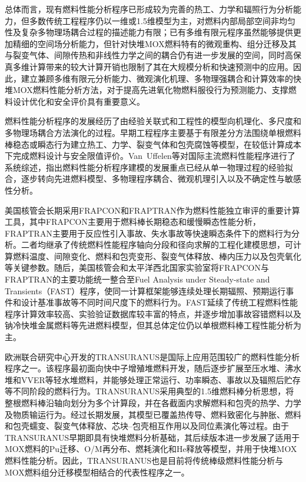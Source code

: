 总体而言，现有燃料性能分析程序已形成较为完善的热工、力学和辐照行为分析能力，但多数传统工程程序仍以一维或1.5维模型为主，对燃料内部局部空间非均匀性及复杂多物理场耦合过程的描述能力有限；已有多维有限元程序虽然能够提供更加精细的空间场分析能力，但针对快堆MOX燃料特有的微观重构、组分迁移及其与裂变气体、间隙传热和非线性力学之间的耦合仍有进一步发展的空间，同时高保真多维计算带来的较大计算开销也限制了其在大规模分析和快速预测中的应用。因此，建立兼顾多维有限元分析能力、微观演化机理、多物理强耦合和计算效率的快堆MOX燃料性能分析方法，对于提高先进氧化物燃料服役行为预测能力、支撑燃料设计优化和安全评价具有重要意义。



燃料性能分析程序的发展经历了由经验关联式和工程性的模型向机理化、多尺度和多物理场耦合方法演化的过程。早期工程程序主要基于有限差分方法围绕单根燃料棒稳态或瞬态行为建立热工、力学、裂变气体和包壳腐蚀等模型，在较低计算成本下完成燃料设计与安全限值评价。Van~Uffelen等\cite{vanuffelenReviewFuelPerformance2019}对国际主流燃料性能程序进行了系统综述，指出燃料性能分析程序建模的发展重点已经从单一物理过程的经验拟合，逐步转向先进燃料模型、多物理程序耦合、微观机理引入以及不确定性与敏感性分析。

美国核管会长期采用FRAPCON和FRAPTRAN作为燃料性能独立审评的重要计算工具，其中FRAPCON主要用于燃料棒长期稳态和缓慢瞬态性能分析，FRAPTRAN主要用于反应性引入事故、失水事故等快速瞬态条件下的燃料行为分析。二者均继承了传统燃料性能程序轴向分段和径向求解的工程化建模思想，可计算燃料温度、间隙变化、燃料和包壳变形、裂变气体释放、棒内压力以及包壳氧化等关键参数。随后，美国核管会和太平洋西北国家实验室将FRAPCON与FRAPTRAN的主要功能统一整合至Fuel Analysis under Steady-state and Transients（FAST）程序，使同一计算框架能够连续处理长期辐照、预期运行事件和设计基准事故等不同时间尺度下的燃料行为\cite{porterFAST10Computer2020}。FAST延续了传统工程燃料性能程序计算效率较高、实验验证数据库较丰富的特点，并逐步增加事故容错燃料以及钠冷快堆金属燃料等先进燃料模型，但其总体定位仍以单根燃料棒工程性能分析为主。

欧洲联合研究中心开发的TRANSURANUS是国际上应用范围较广的燃料性能分析程序之一。该程序最初面向快中子增殖堆燃料开发，随后逐步扩展至压水堆、沸水堆和VVER等轻水堆燃料，并能够处理正常运行、功率瞬态、事故以及辐照后贮存等不同阶段的燃料行为\cite{lassmannTRANSURANUSFuelRod1992}。TRANSURANUS采用典型的1.5维燃料棒分析思想，将整根燃料棒沿轴向划分为多个计算段，并在各截面内求解燃料和包壳的热学、力学及物质输运行为。经过长期发展，其模型已覆盖热传导、燃料致密化与肿胀、燃料和包壳蠕变、裂变气体释放、芯块--包壳相互作用以及同位素演化等过程。由于TRANSURANUS早期即具有快堆燃料分析基础，其后续版本进一步发展了适用于MOX燃料的Pu迁移、O/M再分布、燃耗演化和He释放等模型，并用于快堆MOX燃料性能分析\cite{dimarcelloExtensionTRANSURANUSPlutonium2012,dimarcelloModellingActinideRedistribution2014}。因此，TRANSURANUS也是目前将传统棒级燃料性能分析与MOX燃料组分迁移模型相结合的代表性程序之一。


